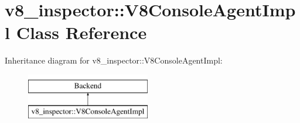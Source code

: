 \hypertarget{classv8__inspector_1_1V8ConsoleAgentImpl}{}\section{v8\+\_\+inspector\+:\+:V8\+Console\+Agent\+Impl Class Reference}
\label{classv8__inspector_1_1V8ConsoleAgentImpl}
Inheritance diagram for v8\+\_\+inspector\+:\+:V8\+Console\+Agent\+Impl\+:\begin{figure}[H]
\begin{center}
\leavevmode
\includegraphics[height=2.000000cm]{classv8__inspector_1_1V8ConsoleAgentImpl}
\end{center}
\end{figure}
